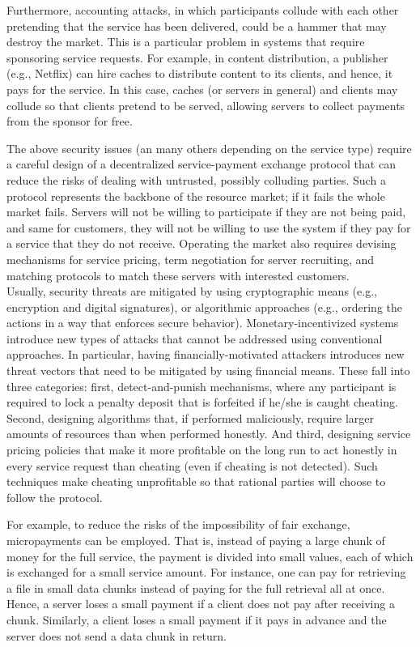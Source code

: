 \documentclass{llncs}
\begin{document}
Furthermore, accounting attacks, in which participants collude with each other pretending that the service has been delivered, could be a hammer that may destroy the market. This is a particular problem in systems that require sponsoring service requests. For example, in content distribution, a publisher (e.g., Netflix) can hire caches to distribute content to its clients, and hence, it pays for the service. In this case, caches (or servers in general) and clients may collude so that clients pretend to be served, allowing servers to collect payments from the sponsor for free. 


The above security issues (an many others depending on the service type) require a careful design of a decentralized service-payment exchange protocol that can reduce the risks of dealing with untrusted, possibly colluding parties. Such a protocol represents the backbone of the resource market; if it fails the whole market fails. Servers will not be willing to participate if they are not being paid, and same for customers, they will not be willing to use the system if they pay for a service that they do not receive. Operating the market also requires devising mechanisms for service pricing, term negotiation for server recruiting, and matching protocols to match these servers with interested customers. \\


 Usually, security threats are mitigated by using cryptographic means (e.g., encryption and digital signatures), or algorithmic approaches (e.g., ordering the actions in a way that enforces secure behavior). Monetary-incentivized systems introduce new types of attacks that cannot be addressed using conventional approaches. In particular, having financially-motivated attackers introduces new threat vectors that need to be mitigated by using financial means. These fall into three categories: first, detect-and-punish mechanisms, where any participant is required to lock a penalty deposit that is forfeited if he/she is caught cheating. Second, designing algorithms that, if performed maliciously, require larger amounts of resources than when performed honestly. And third, designing service pricing policies that make it more profitable on the long run to act honestly in every service request than cheating (even if cheating is not detected). Such techniques make cheating unprofitable so that rational parties will choose to follow the protocol.


For example, to reduce the risks of the impossibility of fair exchange, micropayments can be employed. That is, instead of paying a large chunk of money for the full service, the payment is divided into small values, each of which is exchanged for a small service amount. For instance, one can pay for retrieving a file in small data chunks instead of paying for the full retrieval all at once. Hence, a server loses a small payment if a client does not pay after receiving a chunk. Similarly, a client loses a small payment if it pays in advance and the server does not send a data chunk in return.
\end{document}
